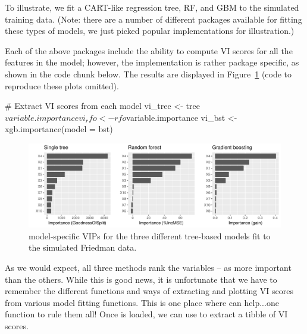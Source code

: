To illustrate, we fit a CART-like regression tree, RF, and GBM to the simulated training data. (Note: there are a number of different packages available for fitting these types of models, we just picked popular implementations for illustration.)


Each of the above packages include the ability to compute VI scores for all the features in the model; however, the implementation is rather package specific, as shown in the code chunk below. The results are displayed in Figure~\ref{fig:vi-plots} (code to reproduce these plots omitted).

\begin{example}
# Extract VI scores from each model
vi_tree <- tree$variable.importance
vi_rfo <- rfo$variable.importance
vi_bst <- xgb.importance(model = bst)
\end{example}

\begin{figure}[!htb]
  \centering 
  \includegraphics[width=1\linewidth]{figures/vi-plots} 
  \caption{model-specific VIPs for the three different tree-based models fit to the simulated Friedman data.}
  \label{fig:vi-plots}
\end{figure}

As we would expect, all three methods rank the variables -- as more important than the others. While this is good news, it is unfortunate that we have to remember the different functions and ways of extracting and plotting VI scores from various model fitting functions. This is one place where  can help...one function to rule them all! Once  is loaded, we can use  to extract a tibble of VI scores.

